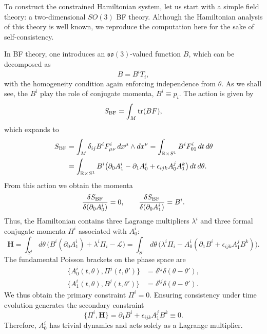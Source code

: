 \documentclass{article}
\numberwithin{equation}{section}
\theoremstyle{definition}
\begin{document}
\medskip
To construct the constrained Hamiltonian system, let us start with a simple field theory: a two-dimensional $SO(3)$ \textrm{BF} theory. Although the Hamiltonian analysis of this theory is well known, we reproduce the computation here for the sake of self-consistency.  

In BF theory, one introduces an $\mathfrak{so}(3)$-valued function $B$, which can be decomposed as
\[
B = B^iT_i,
\]
with the homogeneity condition again enforcing independence from $\theta$. As we shall see, the $B^i$ play the role of conjugate momenta, $B^i\equiv p_i$. The action is given by
\begin{equation}
    S_{\rm BF}=\int_M \mathrm{tr}(BF),
\end{equation}
which expands to
\begin{equation}
    \begin{split}
        S_{\rm BF}&=\int_M \delta_{ij}B^iF^i_{\mu\nu}\,dx^{\mu}\wedge dx^{\nu}=\int_{\mathbb{R}\times S^1} B^iF^i_{01}\,dt\,d\theta\\
&=\int_{\mathbb{R}\times S^1} B^i\bigl(\partial_0A_1^i-\partial_1A_0^i+\epsilon_{ijk}A^j_0A^k_1\bigr)\,dt\,d\theta.
    \end{split}
\end{equation}
From this action we obtain the momenta
\begin{equation}
    \frac{\delta S_{\rm BF}}{\delta(\partial_0A_0^i)}=0,
    \qquad
    \frac{\delta S_{\rm BF}}{\delta(\partial_0A_1^i)}=B^i.
\end{equation}
Thus, the Hamiltonian contains three Lagrange multipliers $\lambda^i$ and three formal conjugate momenta $\Pi^i$ associated with $A_0^i$:
\begin{equation}
    \mathbf{H}=\int_{S^1} d\theta \,\bigl(B^i(\partial_0A_1^i)+\lambda^i\Pi_i-\mathcal{L}\bigr)
=\int_{S^1} d\theta \,\bigl(\lambda^i\Pi_i-A_0^i(\partial_1B^i+\epsilon_{ijk}A^j_1B^k)\bigr).
\end{equation}
The fundamental Poisson brackets on the phase space are
\begin{equation}
\begin{split}
\{A^i_0(t,\theta),\Pi^j(t,\theta')\}&=\delta^{ij}\delta(\theta-\theta'),\\
\{A^i_1(t,\theta),B^j(t,\theta')\}&=\delta^{ij}\delta(\theta-\theta').
\end{split}
\end{equation}
We thus obtain the primary constraint $\Pi^i=0$. Ensuring consistency under time evolution generates the secondary constraint
\begin{equation}
    \{\Pi^i,\mathbf{H}\}=\partial_1B^i+\epsilon_{ijk}A^j_1B^k \equiv 0.
\end{equation}
Therefore, $A_0^i$ has trivial dynamics and acts solely as a Lagrange multiplier. 
\end{document}
